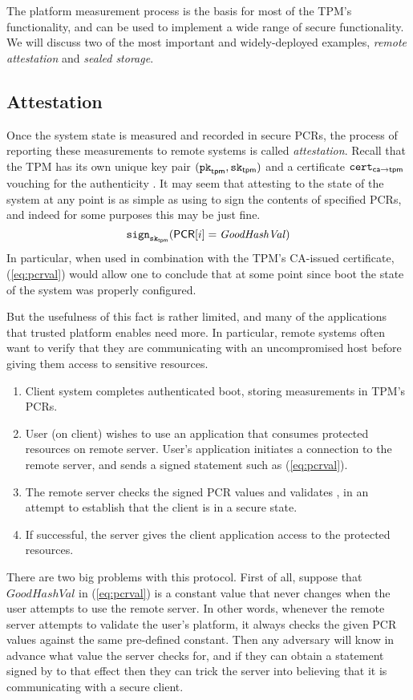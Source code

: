 \documentclass[11pt,twoside]{scrartcl}
\begin{document}
The platform measurement process is the basis for most of the TPM's functionality, and can be used to implement a wide range of secure functionality. We will discuss two of the most important and widely-deployed examples, \emph{remote attestation} and \emph{sealed storage}.

\subsection{Attestation}

Once the system state is measured and recorded in secure PCRs, the process of reporting these measurements to remote systems is called \emph{attestation}. Recall that the TPM has its own unique key pair $(\texttt{\upshape pk}_{\mathsf{tpm}},\texttt{\upshape sk}_{\mathsf{tpm}})$ and a certificate $\texttt{\upshape cert}_{\mathsf{ca} \to \mathsf{tpm}}$ vouching for the authenticity \pktpm. It may seem that attesting to the state of the system at any point is as simple as using \sktpm to sign the contents of specified PCRs, and indeed for some purposes this may be just fine. 
\begin{equation}
\label{eq:pcrval}
\sign{\sktpm}{\pcr[i] = \mathit{GoodHashVal}}
\end{equation}
In particular, when used in combination with the TPM's CA-issued certificate, (\ref{eq:pcrval}) would allow one to conclude that at some point since boot the state of the system was properly configured.

But the usefulness of this fact is rather limited, and many of the applications that trusted platform enables need more. In particular, remote systems often want to verify that they are communicating with an uncompromised host before giving them access to sensitive resources.
\begin{enumerate}
\item Client system completes authenticated boot, storing measurements in TPM's PCRs.
\item User (on client) wishes to use an application that consumes protected resources on remote server. User's application initiates a connection to the remote server, and sends a signed statement such as (\ref{eq:pcrval}).
\item The remote server checks the signed PCR values and validates \pktpm, in an attempt to establish that the client is in a secure state.
\item If successful, the server gives the client application access to the protected resources.
\end{enumerate}
There are two big problems with this protocol. First of all, suppose that $\mathit{GoodHashVal}$ in (\ref{eq:pcrval}) is a constant value that never changes when the user attempts to use the remote server. In other words, whenever the remote server attempts to validate the user's platform, it always checks the given PCR values against the same pre-defined constant. Then any adversary will know in advance what value the server checks for, and if they can obtain a statement signed by \tpm to that effect then they can trick the server into believing that it is communicating with a secure client.
\end{document}
